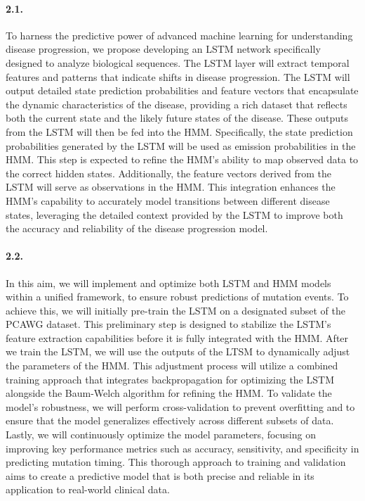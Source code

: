 \paragraph{2.1. \SpecificAimTwoA}

To harness the predictive power of advanced machine learning for understanding disease progression, 
we propose developing an LSTM network specifically designed to analyze biological sequences. 
The LSTM layer will extract temporal features and patterns that indicate shifts in disease progression. 
The LSTM will output detailed state prediction probabilities and feature vectors that 
encapsulate the dynamic characteristics of the disease, 
providing a rich dataset that reflects both the current state and the likely future states of the disease. 
These outputs from the LSTM will then be fed into the HMM. 
Specifically, the state prediction probabilities generated by the LSTM will be used as emission probabilities in the HMM. 
This step is expected to refine the HMM's ability to map observed data to the correct hidden states. 
Additionally, the feature vectors derived from the LSTM will serve as observations in the HMM. 
This integration enhances the HMM’s capability to accurately model transitions between different disease states, 
leveraging the detailed context provided by the LSTM to improve both the accuracy and reliability of the disease progression model.


\paragraph{2.2. \SpecificAimTwoB}

In this aim, we will implement and optimize both LSTM and HMM models within a unified framework, 
to ensure robust predictions of mutation events. 
To achieve this, we will initially pre-train the LSTM on a designated subset of the PCAWG dataset. 
This preliminary step is designed to stabilize the LSTM's feature extraction capabilities before it is fully integrated with the HMM. 
After we train the LSTM, we will use the outputs of the LTSM to dynamically adjust the parameters of the HMM. 
This adjustment process will utilize a combined training approach that integrates backpropagation for optimizing 
the LSTM alongside the Baum-Welch algorithm for refining the HMM. 
To validate the model's robustness, we will perform cross-validation to prevent overfitting 
and to ensure that the model generalizes effectively across different subsets of data. 
Lastly, we will continuously optimize the model parameters, focusing on improving key performance metrics such as 
accuracy, sensitivity, and specificity in predicting mutation timing. 
This thorough approach to training and validation aims to create a predictive model that is both precise and reliable in its application to real-world clinical data.

